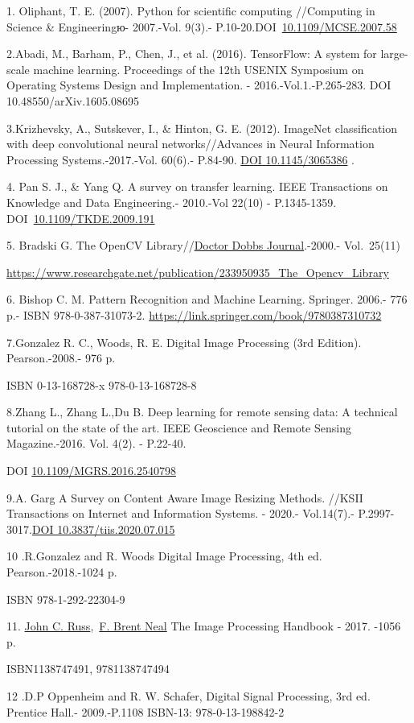 \begin{references}
1. Oliphant, T. E. (2007). Python for scientific computing //Computing in
Science \& Engineeringю- 2007.-Vol. 9(3).-
P.10-20.DOI~\href{https://doi.org/10.1109/MCSE.2007.58}{10.1109/MCSE.2007.58}

2.Abadi, M., Barham, P., Chen, J., et al. (2016). TensorFlow: A system
for large-scale machine learning. Proceedings of the 12th USENIX
Symposium on Operating Systems Design and Implementation. -
2016.-Vol.1.-P.265-283. DOI 10.48550/arXiv.1605.08695

3.Krizhevsky, A., Sutskever, I., \& Hinton, G. E. (2012). ImageNet
classification with deep convolutional neural networks//Advances in
Neural Information Processing Systems.-2017.-Vol. 60(6).- P.84-90.
\href{https://dl.acm.org/doi/10.1145/3065386}{DOI 10.1145/3065386} .

4. Pan S. J., \& Yang Q. A survey on transfer learning. IEEE
Transactions on Knowledge and Data Engineering.- 2010.-Vol 22(10) -
P.1345-1359.
DOI~\href{https://doi.org/10.1109/TKDE.2009.191}{10.1109/TKDE.2009.191}

5. Bradski G. The OpenCV
Library//\href{https://www.researchgate.net/journal/Doctor-Dobbs-Journal-1044-789X?_tp=eyJjb250ZXh0Ijp7ImZpcnN0UGFnZSI6InB1YmxpY2F0aW9uIiwicGFnZSI6InB1YmxpY2F0aW9uIn19}{Doctor
Dobbs Journal}.-2000.- Vol.~25(11)

\url{https://www.researchgate.net/publication/233950935_The_Opencv_Library}

6. Bishop C. M. Pattern Recognition and Machine Learning. Springer.
2006.- 776 p.- ISBN 978-0-387-31073-2.
\url{https://link.springer.com/book/9780387310732}

7.Gonzalez R. C., Woods, R. E. Digital Image Processing (3rd Edition).
Pearson.-2008.- 976 p.

ISBN 0-13-168728-x 978-0-13-168728-8

8.Zhang L., Zhang L.,Du B. Deep learning for remote sensing data: A
technical tutorial on the state of the art. IEEE Geoscience and Remote
Sensing Magazine.-2016. Vol. 4(2). - P.22-40.

DOI
\href{http://dx.doi.org/10.1109/MGRS.2016.2540798}{10.1109/MGRS.2016.2540798}

9.A. Garg A Survey on Content Aware Image Resizing Methods. //KSII
Transactions on Internet and Information Systems. - 2020.- Vol.14(7).-
P.2997-3017.\href{https://doi.org/10.3837/tiis.2020.07.015}{DOI
10.3837/tiis.2020.07.015}

10 .R.Gonzalez and R. Woods Digital Image Processing, 4th ed.
Pearson.-2018.-1024 p.

ISBN 978-1-292-22304-9

11.
\href{https://www.google.kz/search?hl=ru&tbo=p&tbm=bks&q=inauthor:\%22John+C.+Russ\%22}{John
C.
Russ},~\href{https://www.google.kz/search?hl=ru&tbo=p&tbm=bks&q=inauthor:\%22F.+Brent+Neal\%22}{F.
Brent Neal} The Image Processing Handbook - 2017. -1056 p.

ISBN1138747491, 9781138747494

12 .D.P Oppenheim and R. W. Schafer, Digital Signal Processing, 3rd ed.
Prentice Hall.- 2009.-P.1108 ISBN-13: 978-0-13-198842-2
\end{references}

